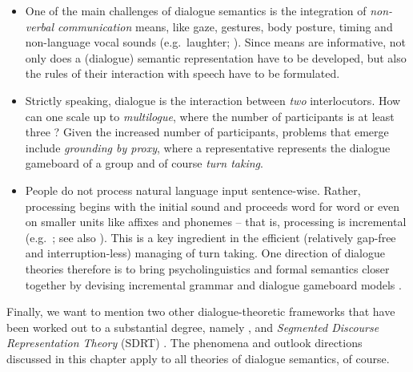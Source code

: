 \documentclass[output=paper
 	        ,biblatex
                ,babelshorthands
                ,newtxmath
                ,draftmode
                ,colorlinks, citecolor=brown
]{langscibook}
\begin{document}
\begin{itemize}
    \item 
One of the main challenges of dialogue semantics is the integration of \emph{non-verbal communication} means, like gaze, gestures, body posture, timing and non-language  vocal sounds (e.g.\ laughter; \citealt{Ginzburg:Breitholz:Cooper:Hough:Tian:2015,Tian:Mazzocconi:Ginzburg:2016}).
%
Since  means are informative, not only does a (dialogue) semantic representation have to be developed, but also the rules of their interaction with speech have to be formulated. 

\item Strictly speaking, dialogue is the interaction between \emph{two} interlocutors.
%
How can one scale up to \emph{multilogue}, where the number of participants is at least three \citep{Ginzburg:Fernandez:2005}?
%
Given the increased number of participants,  problems that emerge include  \emph{grounding by proxy}, where a representative represents the dialogue gameboard of a group \citep{Eshghi:Healey:2016} and of course \emph{turn taking}.

\item People do not process natural language input sentence-wise.
%
Rather, processing begins with the initial sound and proceeds word for word or even on smaller units like affixes and phonemes -- that is, processing is incremental (e.g.\ \citealt{Sedivy:Tanenhaus:Chambers:Carlson:1999}; see also ). This is a key ingredient in the efficient (relatively gap-free and interruption-less) managing of turn taking.
%
One direction of dialogue theories therefore is to bring psycholinguistics and formal semantics closer together by devising incremental grammar and dialogue gameboard models \citep{Hough:Kennington:Schlangen:Ginzburg:2015,Demberg:Keller:Koller:2013,Poesio:Rieser:2011}.

\end{itemize}


Finally, we want to mention two other dialogue-theoretic frameworks that have been worked out to a substantial degree, namely  \citep{Traum:1994,Poesio:1995,Poesio:Traum:1997,Poesio:Rieser:2010}, and \emph{Segmented Discourse Representation Theory} (SDRT) \citep{Asher:1993,Asher:Lascarides:2003,Asher:Lascarides:2013,Hunter:Asher:2015}.
%
The phenomena and outlook directions discussed in this chapter apply to all theories of dialogue semantics, of course. 
\end{document}
